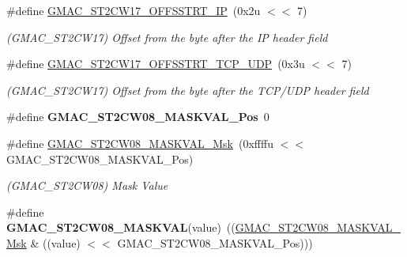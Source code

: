 \begin{DoxyCompactItemize}
\mbox{\label{group__SAMV71__GMAC_ga6cd6f8f4a377c9224c0f051b189e8ffe}} 
\#define \mbox{\hyperlink{group__SAMV71__GMAC_ga6cd6f8f4a377c9224c0f051b189e8ffe}{G\+M\+A\+C\+\_\+\+S\+T2\+C\+W17\+\_\+\+O\+F\+F\+S\+S\+T\+R\+T\+\_\+\+IP}}~(0x2u $<$$<$ 7)
\begin{DoxyCompactList}\small\item\em (G\+M\+A\+C\+\_\+\+S\+T2\+C\+W17) Offset from the byte after the IP header field \end{DoxyCompactList}\item 
\mbox{\label{group__SAMV71__GMAC_gaa1fded62434a9d763c74c4583e0c6324}} 
\#define \mbox{\hyperlink{group__SAMV71__GMAC_gaa1fded62434a9d763c74c4583e0c6324}{G\+M\+A\+C\+\_\+\+S\+T2\+C\+W17\+\_\+\+O\+F\+F\+S\+S\+T\+R\+T\+\_\+\+T\+C\+P\+\_\+\+U\+DP}}~(0x3u $<$$<$ 7)
\begin{DoxyCompactList}\small\item\em (G\+M\+A\+C\+\_\+\+S\+T2\+C\+W17) Offset from the byte after the T\+C\+P/\+U\+DP header field \end{DoxyCompactList}\item 
\mbox{\label{group__SAMV71__GMAC_ga53502b66ee26584ac3b293d2e93169bf}} 
\#define {\bfseries G\+M\+A\+C\+\_\+\+S\+T2\+C\+W08\+\_\+\+M\+A\+S\+K\+V\+A\+L\+\_\+\+Pos}~0
\item 
\mbox{\label{group__SAMV71__GMAC_gaafeb6de879cef9024cb00fabec585d7d}} 
\#define \mbox{\hyperlink{group__SAMV71__GMAC_gaafeb6de879cef9024cb00fabec585d7d}{G\+M\+A\+C\+\_\+\+S\+T2\+C\+W08\+\_\+\+M\+A\+S\+K\+V\+A\+L\+\_\+\+Msk}}~(0xffffu $<$$<$ G\+M\+A\+C\+\_\+\+S\+T2\+C\+W08\+\_\+\+M\+A\+S\+K\+V\+A\+L\+\_\+\+Pos)
\begin{DoxyCompactList}\small\item\em (G\+M\+A\+C\+\_\+\+S\+T2\+C\+W08) Mask Value \end{DoxyCompactList}\item 
\mbox{\label{group__SAMV71__GMAC_ga08decedd03090aa8585d015708819f2d}} 
\#define {\bfseries G\+M\+A\+C\+\_\+\+S\+T2\+C\+W08\+\_\+\+M\+A\+S\+K\+V\+AL}(value)~((\mbox{\hyperlink{group__SAMV71__GMAC_gaafeb6de879cef9024cb00fabec585d7d}{G\+M\+A\+C\+\_\+\+S\+T2\+C\+W08\+\_\+\+M\+A\+S\+K\+V\+A\+L\+\_\+\+Msk}} \& ((value) $<$$<$ G\+M\+A\+C\+\_\+\+S\+T2\+C\+W08\+\_\+\+M\+A\+S\+K\+V\+A\+L\+\_\+\+Pos)))

\end{DoxyCompactItemize}
